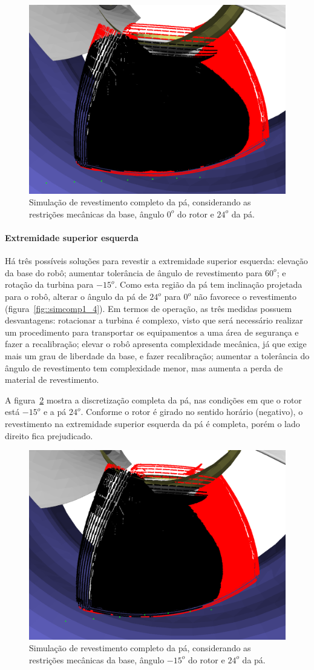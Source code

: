 \begin{figure}[!ht]
	\centering	
	\includegraphics[width=.5\columnwidth]{figs/simcomp1_1.png}
	\caption{Simulação de revestimento completo da pá, considerando as
	restrições mecânicas da base, ângulo $0^o$ do rotor e $24^o$ da pá.}
	\label{fig::simcomp1_1}
\end{figure}

\paragraph{Extremidade superior esquerda}
Há três possíveis soluções para revestir a extremidade superior esquerda:
elevação da base do robô; aumentar tolerância de ângulo de revestimento para
$60^o$; e rotação da turbina para $-15^o$. Como esta
região da pá tem inclinação projetada para o robô, alterar o ângulo da pá de $24^o$ para $0^o$ não favorece o
revestimento (figura~\ref{fig::simcomp1_4}). Em termos de operação, as três
medidas possuem desvantagens: rotacionar a turbina é complexo, visto que será
necessário realizar um procedimento para transportar os equipamentos a uma área
de segurança e fazer a recalibração; elevar o robô apresenta complexidade
mecânica, já que exige mais um grau de liberdade da base, e fazer recalibração;
aumentar a tolerância do ângulo de revestimento tem complexidade menor, mas
aumenta a perda de material de revestimento.

A figura~\ref{fig::simcomp1_5} mostra a discretização completa da pá, nas
condições em que o rotor está $-15^o$ e a pá $24^o$. Conforme o rotor é
girado no sentido horário (negativo), o revestimento na extremidade superior
esquerda da pá é completa, porém o lado direito fica prejudicado.

\begin{figure}[!ht]
	\centering	
	\includegraphics[width=.5\columnwidth]{figs/simcomp1_5.png}
	\caption{Simulação de revestimento completo da pá, considerando as
	restrições mecânicas da base, ângulo $-15^o$ do rotor e $24^o$ da pá.}
	\label{fig::simcomp1_5}
\end{figure}

